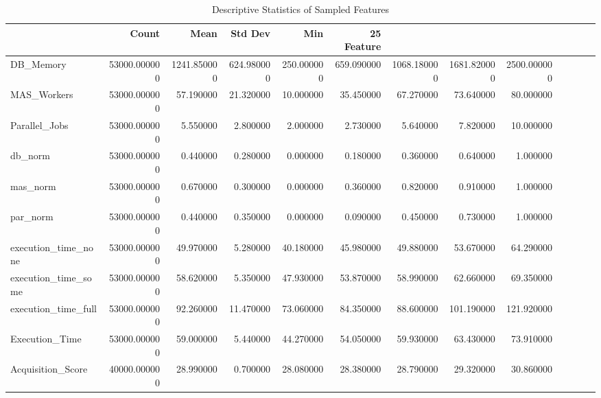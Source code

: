 \begin{table}
\caption{Descriptive Statistics of Sampled Features}
\label{tab:data_summary}
\begin{tabular}{lrrrrrrrr}
\toprule
 & Count & Mean & Std Dev & Min & 25%
Feature &  &  &  &  &  &  &  &  \\
\midrule
DB_Memory & 53000.000000 & 1241.850000 & 624.980000 & 250.000000 & 659.090000 & 1068.180000 & 1681.820000 & 2500.000000 \\
MAS_Workers & 53000.000000 & 57.190000 & 21.320000 & 10.000000 & 35.450000 & 67.270000 & 73.640000 & 80.000000 \\
Parallel_Jobs & 53000.000000 & 5.550000 & 2.800000 & 2.000000 & 2.730000 & 5.640000 & 7.820000 & 10.000000 \\
db_norm & 53000.000000 & 0.440000 & 0.280000 & 0.000000 & 0.180000 & 0.360000 & 0.640000 & 1.000000 \\
mas_norm & 53000.000000 & 0.670000 & 0.300000 & 0.000000 & 0.360000 & 0.820000 & 0.910000 & 1.000000 \\
par_norm & 53000.000000 & 0.440000 & 0.350000 & 0.000000 & 0.090000 & 0.450000 & 0.730000 & 1.000000 \\
execution_time_none & 53000.000000 & 49.970000 & 5.280000 & 40.180000 & 45.980000 & 49.880000 & 53.670000 & 64.290000 \\
execution_time_some & 53000.000000 & 58.620000 & 5.350000 & 47.930000 & 53.870000 & 58.990000 & 62.660000 & 69.350000 \\
execution_time_full & 53000.000000 & 92.260000 & 11.470000 & 73.060000 & 84.350000 & 88.600000 & 101.190000 & 121.920000 \\
Execution_Time & 53000.000000 & 59.000000 & 5.440000 & 44.270000 & 54.050000 & 59.930000 & 63.430000 & 73.910000 \\
Acquisition_Score & 40000.000000 & 28.990000 & 0.700000 & 28.080000 & 28.380000 & 28.790000 & 29.320000 & 30.860000 \\
\bottomrule
\end{tabular}
\end{table}

